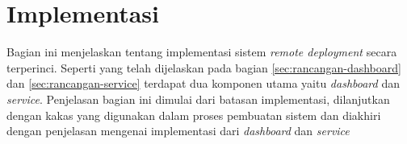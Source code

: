 \section{Implementasi}

Bagian ini menjelaskan tentang implementasi sistem \textit{remote deployment} secara terperinci. Seperti yang telah dijelaskan pada bagian \ref{sec:rancangan-dashboard} dan \ref{sec:rancangan-service} terdapat dua komponen utama yaitu \textit{dashboard} dan \textit{service}. Penjelasan bagian ini dimulai dari batasan implementasi, dilanjutkan dengan kakas yang digunakan dalam proses pembuatan sistem dan diakhiri dengan penjelasan mengenai implementasi dari \textit{dashboard} dan \textit{service}









\pagebreak

